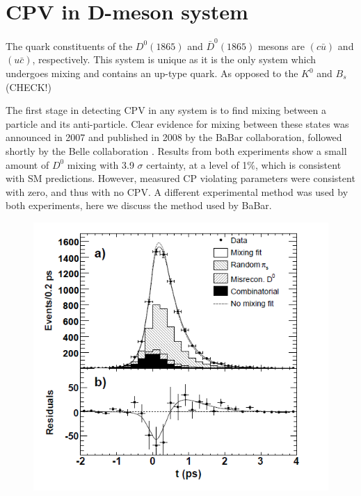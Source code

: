 \section{CPV in D-meson system}

The quark constituents of the $D^{0}(1865)$ and $\bar{D}^{0}(1865)$ mesons are $(c \bar{u})$ and $(u \bar{c})$, respectively. This system is unique as it is the only system which undergoes mixing and contains an up-type quark. As opposed to the $K^{0}$ and $B_{s}$ (CHECK!)


The first stage in detecting CPV in any system is to find mixing between a particle and its anti-particle. Clear evidence for mixing between these states was announced in 2007 and published in 2008 by the BaBar collaboration, followed shortly by the Belle collaboration \cite{BabarD0mixing}\cite{BelleD0mixing}. Results from both experiments show a small amount of $D^{0}$ mixing with 3.9 $\sigma$ certainty, at a level of 1$\%$, which is consistent with SM predictions. However, measured CP violating parameters were consistent with zero, and thus with no CPV. A different experimental method was used by both experiments, here we discuss the method used by BaBar.  





\begin{figure}[h!]
\begin{center}
\includegraphics[scale=0.4]{figs/BaBar_D0_Mixing_Results.png}
\end{center}
\caption{\textit{ }}
\label{BaBar_D0_Mixing_Results.png}
\end{figure}

